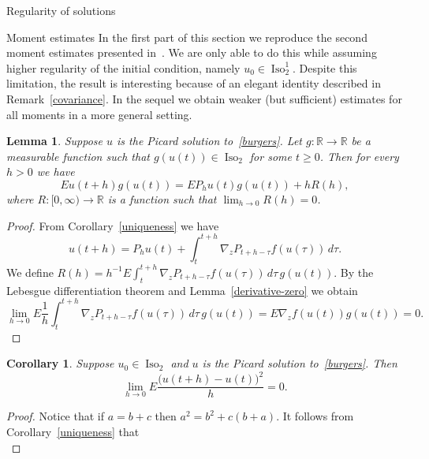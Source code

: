 \documentclass[a4paper,10pt,fleqn]{amsart}
\newtheorem{lemma}[theorem]{Lemma}
\newtheorem{corollary}[theorem]{Corollary}
\theoremstyle{remark}
\theoremstyle{definition}
\DeclareMathOperator{\Iso}{Iso}
\newcommand{\grad} {\nabla_{\!z}}
\newcommand{\R} {\mathbb{R}}
\newcommand{\T} {[0,\infty)}
\renewcommand{\=} {\overset{d}{=}}
\begin{document}
\begin{section}{Regularity of solutions}\label{apriori}
\begin{subsection}{Moment estimates}
     In the first part of this section we reproduce the second moment estimates presented in~\cite{MR0264252}.
     We are only able to do this while assuming higher regularity of the initial condition, namely $u_0\in\Iso_2^1$.
     Despite this limitation, the result is interesting because of an elegant identity described in Remark~\ref{covariance}. In the sequel we obtain weaker (but sufficient) estimates for all moments in a more general
     setting.
     
     \begin{lemma}\label{infinitesimal-linearisation}
     Suppose $u$ is the Picard solution to~\eqref{burgers}.
     Let $g:\R\to\R$ be a measurable function such that $g(u(t))\in\Iso_2$ for some $t\geq0$.
     Then for every $h>0$ we have 
     \begin{equation*}
      Eu(t+h)g(u(t)) = EP_hu(t)g(u(t)) + hR(h),
     \end{equation*}
     where $R:\T\to\R$ is a function such that $\lim_{h\to0}R(h)=0$.
    \end{lemma}
    \begin{proof}
     From Corollary~\ref{uniqueness} we have
     \begin{equation*}
      u(t+h) = P_hu(t) + \int_t^{t+h}\grad P_{t+h-\tau}f(u(\tau))\,d\tau.
     \end{equation*}
     We define $R(h) = h^{-1}E\int_t^{t+h}\grad P_{t+h-\tau}f(u(\tau))\,d\tau\, g(u(t))$.
     By the Lebesgue differentiation theorem and Lemma~\ref{derivative-zero} we obtain
     \begin{equation*}
      \lim_{h\to0}E\frac{1}{h}\int_t^{t+h}\grad P_{t+h-\tau}f(u(\tau))\,d\tau\, g(u(t)) = E \grad f(u(t)) g(u(t)) = 0.
     \end{equation*}
    \end{proof}
    \begin{corollary}\label{c1/2}
     Suppose $u_0\in\Iso_2$ and $u$ is the Picard solution to~\eqref{burgers}. Then
     \begin{equation*}
      \lim_{h\to0}E\frac{\big(u(t+h)-u(t)\big)^2}{h}=0.
     \end{equation*}
    \end{corollary}
    \begin{proof} Notice that if $a=b+c$ then $a^2=b^2 + c(b+a)$.
     It follows from Corollary~\ref{uniqueness} that
     \begin{equation*}

\end{equation*}
\end{proof}
\end{subsection}
\end{section}
\end{document}
